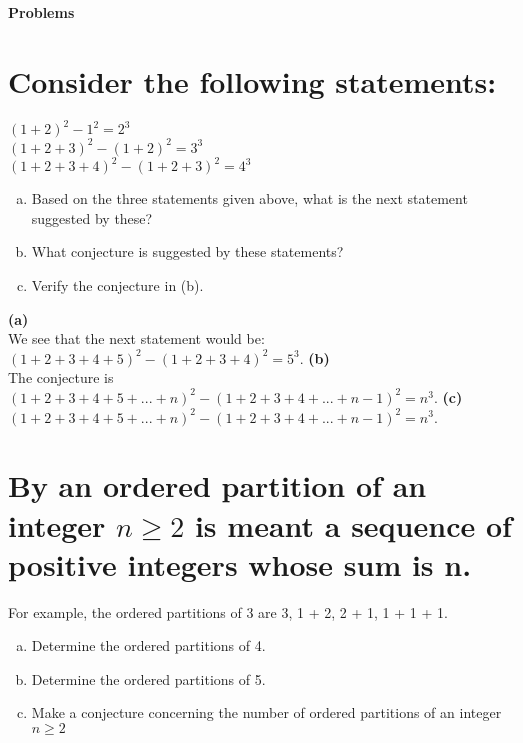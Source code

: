 \textbf{\Huge Problems}
\section{Consider the following statements:}
$(1+2)^2-1^2=2^3$\\
$(1+2+3)^2-(1+2)^2=3^3$\\
$(1+2+3+4)^2-(1+2+3)^2=4^3$\\
\begin{enumerate}[(a)]
\item Based on the three statements given above, what is the next statement suggested by these?
\item What conjecture is suggested by these statements?
\item Verify the conjecture in (b).
\end{enumerate}
\textbf{\Large(a)}\\
We see that the next statement would be: $(1+2+3+4+5)^2-(1+2+3+4)^2=5^3$.
\textbf{\Large(b)}\\
The conjecture is $(1+2+3+4+5+...+n)^2-(1+2+3+4+...+n-1)^2=n^3$.
\textbf{\Large(c)}\\
$(1+2+3+4+5+...+n)^2-(1+2+3+4+...+n-1)^2=n^3$.

\section{By an ordered partition of an integer $n\geq 2$ is meant a sequence of positive integers whose sum is n.}
For example, the ordered partitions of 3 are 3, 1 + 2, 2 + 1, 1 + 1 + 1.
\begin{enumerate}[(a)]
\item Determine the ordered partitions of 4.
\item Determine the ordered partitions of 5.
\item Make a conjecture concerning the number of ordered partitions of an integer $n\geq 2$
\end{enumerate}


